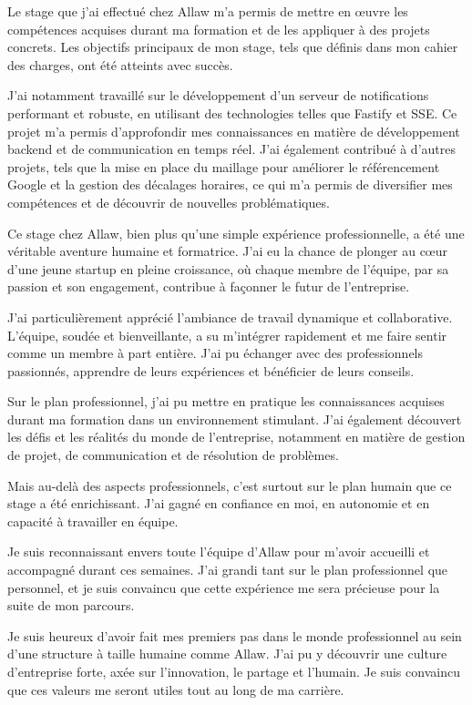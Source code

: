 Le stage que j'ai effectué chez Allaw m'a permis de mettre en œuvre les
compétences acquises durant ma formation et de les appliquer à des projets
concrets. Les objectifs principaux de mon stage, tels que définis dans mon
cahier des charges, ont été atteints avec succès.

J'ai notamment travaillé sur le développement d'un serveur de notifications
performant et robuste, en utilisant des technologies telles que Fastify et SSE.
Ce projet m'a permis d'approfondir mes connaissances en matière de développement
backend et de communication en temps réel. J'ai également contribué à d'autres
projets, tels que la mise en place du maillage pour améliorer le référencement
Google et la gestion des décalages horaires, ce qui m'a permis de diversifier
mes compétences et de découvrir de nouvelles problématiques.

Ce stage chez Allaw, bien plus qu'une simple expérience professionnelle, a été
une véritable aventure humaine et formatrice. J'ai eu la chance de plonger au
cœur d'une jeune startup en pleine croissance, où chaque membre de l'équipe, par
sa passion et son engagement, contribue à façonner le futur de l'entreprise.

J'ai particulièrement apprécié l'ambiance de travail dynamique et collaborative.
L'équipe, soudée et bienveillante, a su m'intégrer rapidement et me faire
sentir comme un membre à part entière. J'ai pu échanger avec des professionnels
passionnés, apprendre de leurs expériences et bénéficier de leurs conseils.

Sur le plan professionnel, j'ai pu mettre en pratique les connaissances acquises
durant ma formation dans un environnement stimulant. J'ai également découvert
les défis et les réalités du monde de l'entreprise, notamment en matière de
gestion de projet, de communication et de résolution de problèmes.

Mais au-delà des aspects professionnels, c'est surtout sur le plan humain que
ce stage a été enrichissant. J'ai gagné en confiance en moi, en autonomie et en
capacité à travailler en équipe.

Je suis reconnaissant envers toute l'équipe d'Allaw pour m'avoir accueilli et
accompagné durant ces semaines. J'ai grandi tant sur le plan professionnel que
personnel, et je suis convaincu que cette expérience me sera précieuse pour la
suite de mon parcours.

Je suis heureux d'avoir fait mes premiers pas dans le monde professionnel au
sein d'une structure à taille humaine comme Allaw. J'ai pu y découvrir une
culture d'entreprise forte, axée sur l'innovation, le partage et l'humain. Je
suis convaincu que ces valeurs me seront utiles tout au long de ma carrière.
